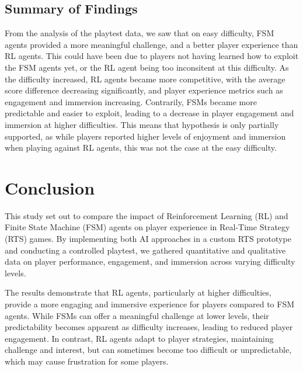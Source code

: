 \documentclass[conference]{IEEEtran}
\begin{document}

\subsection{Summary of Findings}
From the analysis of the playtest data, we saw that on easy difficulty, FSM agents provided a more meaningful challenge, and a better player experience than RL agents.
This could have been due to players not having learned how to exploit the FSM agents yet, or the RL agent being too inconsitent at this difficulty.
As the difficulty increased, RL agents became more competitive, with the average score difference decreasing significantly, and player experience metrics such as engagement and immersion increasing.
Contrarily, FSMs became more predictable and easier to exploit, leading to a decrease in player engagement and immersion at higher difficulties.
This means that hypothesis is only partially supported, as while players reported higher levels of enjoyment and immersion when playing against RL agents, this was not the case at the easy difficulty.

\section{Conclusion}

This study set out to compare the impact of Reinforcement Learning (RL) and Finite State Machine (FSM) agents on player experience in Real-Time Strategy (RTS) games.
By implementing both AI approaches in a custom RTS prototype and conducting a controlled playtest, we gathered quantitative and qualitative data on player performance, engagement,
and immersion across varying difficulty levels.

The results demonstrate that RL agents, particularly at higher difficulties, provide a more engaging and immersive experience for players compared to FSM agents.
While FSMs can offer a meaningful challenge at lower levels, their predictability becomes apparent as difficulty increases, leading to reduced player engagement. In contrast, RL agents adapt to player strategies, maintaining challenge and interest, but can sometimes become too difficult or unpredictable, which may cause frustration for some players.
\end{document}
